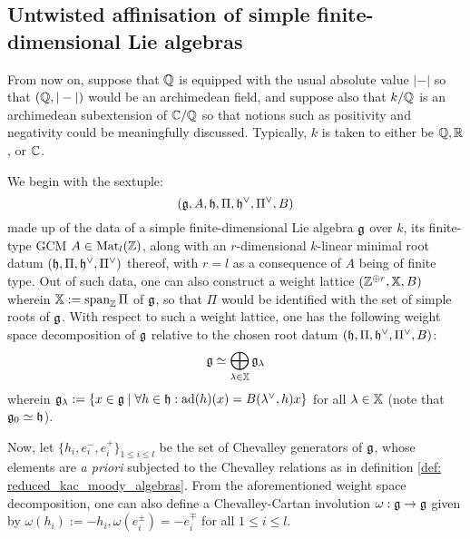     \subsection{Untwisted affinisation of simple finite-dimensional Lie algebras} \label{subsection: untwisted_affinisation_of_simple_finite_dimensional_lie_algebras}
        \begin{convention}
            From now on, suppose that $\mathbb{Q}$ is equipped with the usual absolute value $|-|$ so that $(\mathbb{Q}, |-|)$ would be an archimedean field, and suppose also that $k/\mathbb{Q}$ is an archimedean subextension of $\mathbb{C}/\mathbb{Q}$ so that notions such as positivity and negativity could be meaningfully discussed. Typically, $k$ is taken to either be $\mathbb{Q}, \mathbb{R}$, or $\mathbb{C}$.
        \end{convention}
        \begin{convention} \label{conv: simple_finite_dimensional_lie_algebras}
            We begin with the sextuple:
                $$(\mathfrak{g}, A, \mathfrak{h}, \Pi, \mathfrak{h}^{\vee}, \Pi^{\vee}, B)$$
            made up of the data of a simple finite-dimensional Lie algebra $\mathfrak{g}$ over $k$, its finite-type GCM $A \in \mathrm{Mat}_l(\mathbb{Z})$, along with an $r$-dimensional $k$-linear minimal root datum $(\mathfrak{h}, \Pi, \mathfrak{h}^{\vee}, \Pi^{\vee})$ thereof, with $r = l$ as a consequence of $A$ being of finite type. Out of such data, one can also construct a weight lattice $(\mathbb{Z}^{\oplus r}, \mathbb{X}, B)$ wherein $\mathbb{X} := \operatorname{span}_{\mathbb{Z}} \Pi$ of $\mathfrak{g}$, so that $\Pi$ would be identified with the set of simple roots of $\mathfrak{g}$. With respect to such a weight lattice, one has the following weight space decomposition of $\mathfrak{g}$ relative to the chosen root datum $(\mathfrak{h}, \Pi, \mathfrak{h}^{\vee}, \Pi^{\vee}, B)$:
                $$\mathfrak{g} \simeq \bigoplus_{\lambda \in \mathbb{X}} \mathfrak{g}_{\lambda}$$
            wherein $\mathfrak{g}_{\lambda} := \{x \in \mathfrak{g} \mid \forall h \in \mathfrak{h}: \mathrm{ad}(h)(x) = B(\lambda^{\vee}, h) x\}$ for all $\lambda \in \mathbb{X}$ (note that $\mathfrak{g}_0 \simeq \mathfrak{h}$).
            
            Now, let $\{h_i, e_i^-, e_i^+\}_{1 \leq i \leq l}$ be the set of Chevalley generators of $\mathfrak{g}$, whose elements are \textit{a priori} subjected to the Chevalley relations as in definition \ref{def: reduced_kac_moody_algebras}. From the aforementioned weight space decomposition, one can also define a Chevalley-Cartan involution $\omega: \mathfrak{g} \to \mathfrak{g}$ given by $\omega(h_i) := -h_i, \omega(e_i^{\pm}) = -e_i^{\mp}$ for all $1 \leq i \leq l$. 
            

\end{convention}
